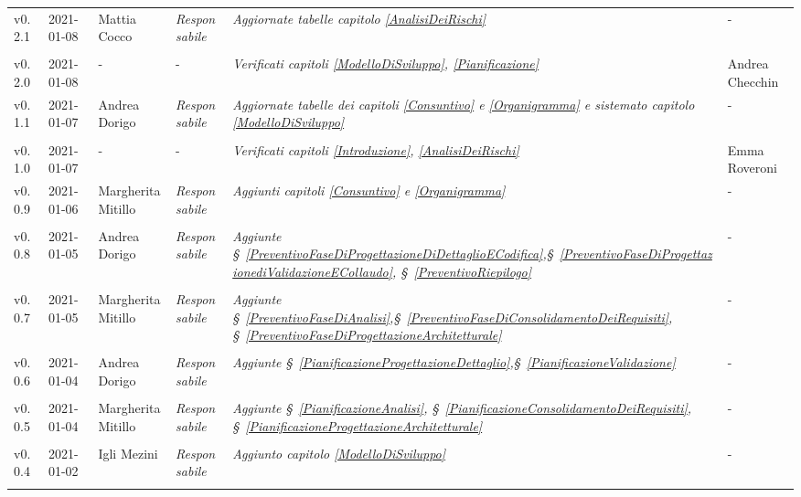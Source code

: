 {\begin{center}
\begin{longtable}[c]{|p{2cm-1\tabcolsep}|p{2cm}|p{3cm-2\tabcolsep}|p{}|p{}|p{4cm-2\tabcolsep}|}
		\hline
		\centering v0.2.1 & 2021-01-08 & Mattia Cocco & \centering \textit{Responsabile} & \textit{Aggiornate tabelle capitolo  \ref{AnalisiDeiRischi}} & \centering -  \\ \tabularnewline
		\hline
		\centering v0.2.0 & 2021-01-08 & \centering - & \centering - & \textit{Verificati capitoli \ref{ModelloDiSviluppo}, \ref{Pianificazione}} & Andrea Checchin  \\ 
		\hline
		\centering v0.1.1 & 2021-01-07 & Andrea Dorigo & \centering \textit{Responsabile} & \textit{Aggiornate tabelle dei capitoli \ref{Consuntivo} e \ref{Organigramma} e sistemato capitolo \ref{ModelloDiSviluppo}} & \centering -  \\ \tabularnewline
		\hline
		\centering v0.1.0 & 2021-01-07 & \centering - & \centering - & 	\textit{Verificati capitoli \ref{Introduzione}, \ref{AnalisiDeiRischi} } & Emma Roveroni  \\ 
		\hline
		\centering v0.0.9 & 2021-01-06 & Margherita Mitillo & \centering \textit{Responsabile} & \textit{Aggiunti capitoli \ref{Consuntivo} e \ref{Organigramma}} & \centering -  \\ \tabularnewline
		\hline
		\centering v0.0.8 & 2021-01-05 & Andrea Dorigo & \centering \textit{Responsabile}  & \textit{Aggiunte \S~\ref{PreventivoFaseDiProgettazioneDiDettaglioECodifica},\S~\ref{PreventivoFaseDiProgettazionediValidazioneECollaudo}, \S~\ref{PreventivoRiepilogo} } & \centering -  \\ \tabularnewline
		\hline
		\centering v0.0.7 & 2021-01-05 & Margherita Mitillo & \centering \textit{Responsabile} & \textit{Aggiunte \S~\ref{PreventivoFaseDiAnalisi},\S~\ref{PreventivoFaseDiConsolidamentoDeiRequisiti}, \S~\ref{PreventivoFaseDiProgettazioneArchitetturale} } & \centering -  \\ \tabularnewline
		\hline
		\centering v0.0.6 & 2021-01-04 & Andrea Dorigo & \centering \textit{Responsabile} & \textit{Aggiunte \S~\ref{PianificazioneProgettazioneDettaglio},\S~\ref{PianificazioneValidazione}} & \centering -  \\ \tabularnewline
		\hline
		\centering v0.0.5 & 2021-01-04 & Margherita Mitillo & \centering \textit{Responsabile} & \textit{Aggiunte  \S~\ref{PianificazioneAnalisi}, \S~\ref{PianificazioneConsolidamentoDeiRequisiti}, \S~\ref{PianificazioneProgettazioneArchitetturale}} & \centering -  \\ \tabularnewline
		\hline
		\centering v0.0.4 & 2021-01-02 & Igli Mezini & \centering \textit{Responsabile} & \textit{Aggiunto capitolo \ref{ModelloDiSviluppo}} & \centering -  \\ \tabularnewline

\end{longtable}
\end{center}}
